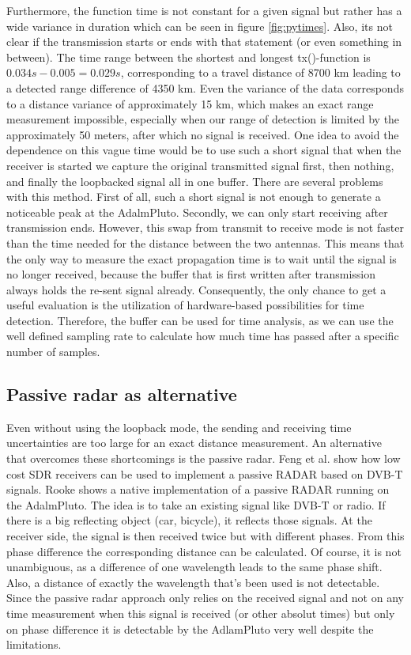 \documentclass[journal]{IEEEtran}
\begin{document}
Furthermore, the function time is not constant for a given signal but rather has a wide variance in duration which can be seen in figure \ref{fig:pytimes}.
Also, its not clear if the transmission starts or ends with that statement (or even something in between).
The time range between the shortest and longest tx()-function is $0.034 s-0.005=0.029 s$,  corresponding to a travel distance of 8700 km leading to a detected range difference of 4350 km.
Even the variance of the data corresponds to a distance variance of approximately 15 km, which makes an exact range measurement impossible, especially when our range of detection is limited by the approximately 50 meters, after which no signal is received.
One idea to avoid the dependence on this vague time would be to use such a short signal that when the receiver is started we capture the original transmitted signal first, then nothing, and finally the loopbacked  signal all in one buffer.
There are several problems with this method.
First of all, such a short signal is not enough to generate a noticeable peak at the AdalmPluto.
Secondly, we can only start receiving after transmission ends.
However, this swap from transmit to receive mode is not faster than the time needed for the distance between the two antennas. 
This means that the only way to measure the exact propagation time is to wait until the signal is no longer received, because the buffer that is first written after transmission always holds the re-sent signal already.
Consequently, the only chance to get a useful evaluation is the utilization of hardware-based possibilities for time detection.
Therefore, the buffer can be used for time analysis, as we can use the well defined sampling rate to calculate how much time has passed after a specific number of samples.

\subsection{Passive radar as alternative}
\label{sec:Alternatives}
Even without using the loopback mode, the sending and receiving time uncertainties are too large for an exact distance measurement.
An alternative that overcomes these shortcomings is the passive radar.
Feng et al. \cite{sdrpassive} show how low cost SDR receivers can be used to implement a passive RADAR based on DVB-T signals.
Rooke \cite{plutopassive} shows a native implementation of a passive RADAR running on the AdalmPluto.
The idea is to take an existing signal like DVB-T or radio.
If there is a big reflecting object (car, bicycle), it reflects those signals.
At the receiver side, the signal is then received twice but with different phases.
From this phase difference the corresponding distance can be calculated.
Of course, it is not unambiguous, as a difference of one wavelength leads to the same phase shift.
Also, a distance of exactly the wavelength that's been used is not detectable.
Since the passive radar approach only relies on the received signal and not on any time measurement when this signal is received (or other absolut times) but only on phase difference it is detectable by the AdlamPluto very well despite the limitations.
\end{document}
